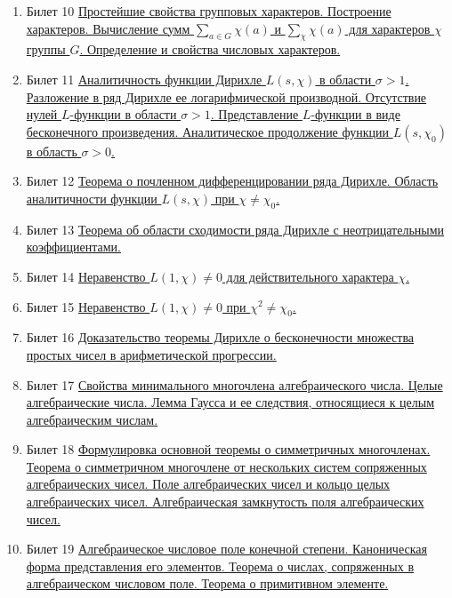 \documentclass[a4paper,12pt]{article}
\begin{document}
\begin{enumerate}
\item{Билет 10}
\hyperlink{bil10}{Простейшие свойства групповых характеров. Построение характеров. Вычисление сумм $\sum_{a\in G} \chi(a)$ и $\sum_\chi \chi(a)$ для характеров $\chi$ группы $G$. Определение и свойства числовых характеров.}

\item{Билет 11}
\hyperlink{bil11}{Аналитичность функции Дирихле $L(s,\chi)$ в области $\sigma > 1$. Разложение в ряд Дирихле ее логарифмической производной. Отсутствие нулей $L$-функции в области $\sigma > 1$. Представление $L$-функции в виде бесконечного произведения. Аналитическое продолжение функции $L(s,\chi_0)$ в область $\sigma > 0$.}


\item{Билет 12}
\hyperlink{bil12}{Теорема о почленном дифференцировании ряда Дирихле. Область аналитичности функции $L(s, \chi)$ при $\chi \not= \chi_0$.}

\item{Билет 13}
\hyperlink{bil13}{Теорема об области сходимости ряда Дирихле с неотрицательными коэффициентами.}

\item{Билет 14}
\hyperlink{bil14}{Неравенство $L(1,\chi)\not=0$ для действительного характера $\chi$.}

\item{Билет 15}
\hyperlink{bil15}{Неравенство $L(1,\chi)\not=0$ при $\chi^2\not=\chi_0$.}


\item{Билет 16}
\hyperlink{bil16}{Доказательство теоремы Дирихле о бесконечности множества простых чисел в арифметической прогрессии.}

\item{Билет 17}
\hyperlink{bil17}{Свойства минимального многочлена алгебраического числа. Целые алгебраические числа. Лемма Гаусса и ее следствия, относящиеся к целым алгебраическим числам.}

\item{Билет 18}
\hyperlink{bil18}{Формулировка основной теоремы о симметричных многочленах. Теорема о симметричном многочлене от нескольких систем сопряженных алгебраических чисел. Поле алгебраических чисел и кольцо целых алгебраических чисел. Алгебраическая замкнутость поля алгебраических чисел.}

\item{Билет 19}
\hyperlink{bil19}{Алгебраическое числовое поле конечной степени. Каноническая форма представления его элементов. Теорема о числах, сопряженных в алгебраическом числовом поле. Теорема о примитивном элементе.}



\end{enumerate}
\end{document}
